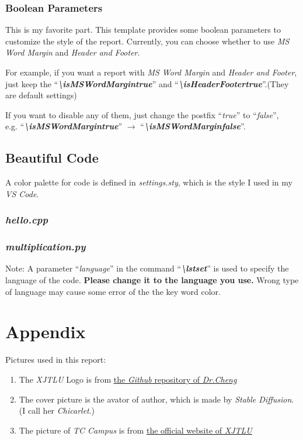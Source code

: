 \documentclass{article}
\begin{document}
\subsubsection{Boolean Parameters}
This is my favorite part. This template provides some boolean parameters to customize the style of the report.
Currently, you can choose whether to use \textit{MS Word Margin} and \textit{Header and Footer}.\par
For example, if you want a report with \textit{MS Word Margin} and \textit{Header and Footer}, 
just keep the ``\textit{\textbf{\textbackslash isMSWordMargintrue}}'' and ``\textit{\textbf{\textbackslash isHeaderFootertrue}}''.(They are default settings)\par
If you want to disable any of them, just change the postfix ``\textit{true}'' to ``\textit{false}'', \\ 
e.g. ``\textit{\textbf{\textbackslash isMSWordMargintrue}}'' \(\rightarrow\) ``\textit{\textbf{\textbackslash isMSWordMarginfalse}}''.

\subsection{Beautiful Code}
\noindent A color palette for code is defined in \textit{settings.sty}, which is the style I used in my \textit{VS Code}.
\subsubsection{\textit{hello.cpp}}


\subsubsection{\textit{multiplication.py}}


\noindent Note: A parameter ``\textit{language}'' in the command ``\textit{\textbf{\textbackslash lstset}}'' is used to specify the language of the code. 
\textbf{Please change it to the language you use.} 
Wrong type of language may cause some error of the the key word color.

\newpage
\section{Appendix}
\noindent Pictures used in this report:
\begin{enumerate}
    \item The \textit{XJTLU} Logo is from \href{https://github.com/feimax/latex_template_for_xjtlu_eee_light}{\underline{the \textit{Github} repository of \textit{Dr.Cheng}}}
    \item The cover picture is the avator of author, which is made by \textit{Stable Diffusion}. (I call her \textit{Chicarlet}.)
    \item The picture of \textit{TC Campus} is from \href{https://www.xjtlu.edu.cn/en/study/departments/entrepreneurship-and-enterprise-hub}{\underline{the official website of \textit{XJTLU}}}
\end{enumerate}
\end{document}
